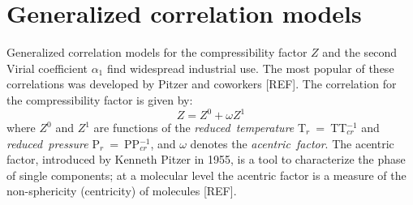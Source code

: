 \documentclass[11pt]{article}
\theoremstyle{definition}
\begin{document}
\clearpage

\section*{Generalized correlation models}
Generalized correlation models for the compressibility factor $Z$ and the second Virial coefficient $\alpha_{1}$ find widespread industrial use.
The most popular of these correlations was developed by Pitzer and coworkers [REF].
The correlation for the compressibility factor is given by:
\begin{equation}
	Z = Z^{0}+\omega Z^{1}
\end{equation}where $Z^{0}$ and $Z^{1}$ are functions of the \textit{reduced~temperature} T$_{r}$~=~TT$_{cr}^{-1}$ and \textit{reduced~pressure} P$_{r}$~=~PP$_{cr}^{-1}$,
and $\omega$ denotes the \textit{acentric~factor}.
The acentric factor, introduced by Kenneth Pitzer in 1955, is a tool to characterize the phase of single components;
at a molecular level the acentric factor is a measure of the non-sphericity (centricity) of molecules [REF].



\end{document}
